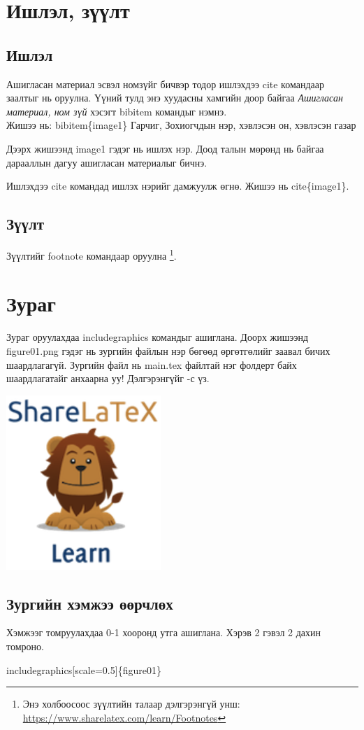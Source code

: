 \chapter{Ишлэл, зүүлт}
\section{Ишлэл}
Ашигласан материал эсвэл номзүйг бичвэр тодор ишлэхдээ cite командаар заалтыг нь оруулна.
Үүний тулд энэ хуудасны хамгийн доор байгаа \textit{Ашигласан материал, ном зүй} хэсэгт
bibitem командыг нэмнэ. \\


Жишээ нь: bibitem\{image1\} Гарчиг, Зохиогчдын нэр, хэвлэсэн он, хэвлэсэн газар

Дээрх жишээнд image1 гэдэг нь ишлэх нэр. Доод талын мөрөнд нь байгаа дарааллын дагуу
ашигласан материалыг бичнэ.

Ишлэхдээ cite командад ишлэх нэрийг дамжуулж өгнө. Жишээ нь cite\{image1\}.
\section{Зүүлт}
Зүүлтийг footnote командаар оруулна \footnote{Энэ холбоосоос зүүлтийн талаар дэлгэрэнгүй унш: \url{https://www.sharelatex.com/learn/Footnotes}}.

\chapter{Зураг}
Зураг оруулахдаа includegraphics командыг ашиглана. Доорх жишээнд figure01.png гэдэг нь зургийн файлын нэр бөгөөд өргөтгөлийг заавал бичих шаардлагагүй. Зургийн файл нь main.tex файлтай нэг фолдерт байх шаардлагатайг анхаарна уу! Дэлгэрэнгүйг \cite{image1}-с үз.

\includegraphics{figure01.png}


\section{Зургийн хэмжээ өөрчлөх}
Хэмжээг томруулахдаа 0-1 хооронд утга ашиглана. Хэрэв 2 гэвэл 2 дахин томроно.
\begin{center}
	includegraphics[scale=0.5]\{figure01\}
\end{center}


